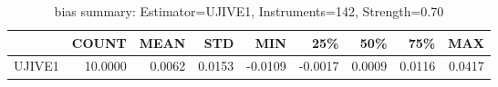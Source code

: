 \begin{table}[ht]
\centering
\caption{bias summary: Estimator=UJIVE1, Instruments=142, Strength=0.70}
\begin{tabular}{lrrrrrrrr}
\toprule
 & COUNT & MEAN & STD & MIN & 25\% & 50\% & 75\% & MAX \\
\midrule
UJIVE1 & 10.0000 & 0.0062 & 0.0153 & -0.0109 & -0.0017 & 0.0009 & 0.0116 & 0.0417 \\
\bottomrule
\end{tabular}
\end{table}
